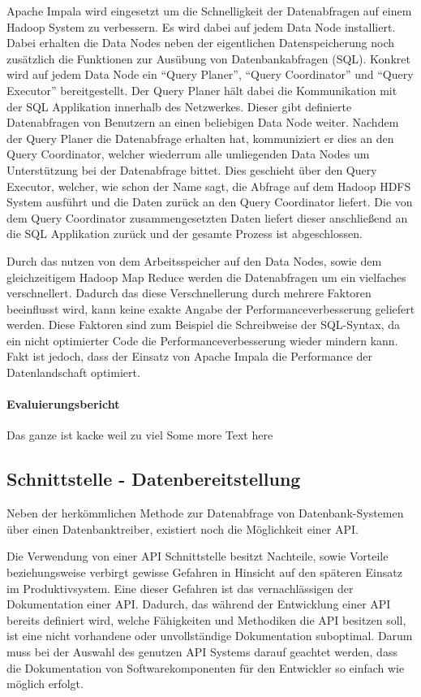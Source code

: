 Apache Impala wird eingesetzt um die Schnelligkeit der Datenabfragen auf
einem Hadoop System zu verbessern. Es wird dabei auf jedem Data Node
installiert. Dabei erhalten die Data Nodes neben der eigentlichen
Datenspeicherung noch zusätzlich die Funktionen zur Ausübung von
Datenbankabfragen (SQL). Konkret wird auf jedem Data Node ein ``Query Planer'',
``Query Coordinator'' und ``Query Executor'' bereitgestellt. Der Query Planer
hält dabei die Kommunikation mit der SQL Applikation innerhalb des Netzwerkes.
Dieser gibt definierte Datenabfragen von Benutzern an einen beliebigen Data
Node weiter. Nachdem der Query Planer die Datenabfrage erhalten hat,
kommuniziert er dies an den Query Coordinator, welcher wiederrum alle
umliegenden Data Nodes um Unterstützung bei der Datenabfrage bittet.
Dies geschieht über den Query Executor, welcher, wie schon der Name sagt,
die Abfrage auf dem Hadoop HDFS System ausführt und die Daten zurück an den
Query Coordinator liefert. Die von dem Query Coordinator zusammengesetzten
Daten liefert dieser anschließend an die SQL Applikation zurück und der
gesamte Prozess ist abgeschlossen.

Durch das nutzen von dem Arbeitsspeicher auf den Data Nodes, sowie dem
gleichzeitigem Hadoop Map Reduce werden die Datenabfragen um ein vielfaches
verschnellert. Dadurch das diese Verschnellerung durch mehrere Faktoren
beeinflusst wird, kann keine exakte Angabe der Performanceverbesserung
geliefert werden. Diese Faktoren sind zum Beispiel die Schreibweise der
SQL-Syntax, da ein nicht optimierter Code die Performanceverbesserung
wieder mindern kann. Fakt ist jedoch, dass der Einsatz von Apache Impala
die Performance der Datenlandschaft optimiert.
\nl%

\paragraph{Evaluierungsbericht}
\label{paragraph:hadoop_hive_impala_evaluierung}
Das ganze ist kacke weil zu viel Some more Text here
\nl%


\subsection{Schnittstelle - Datenbereitstellung}
\label{subsec:schnittstelle_datenbereitstellung}
Neben der herkömmlichen Methode zur Datenabfrage von Datenbank-Systemen über
einen Datenbanktreiber, existiert noch die Möglichkeit einer API\@.

Die Verwendung von einer API Schnittstelle besitzt Nachteile, sowie Vorteile
beziehungsweise verbirgt gewisse Gefahren in Hinsicht auf den späteren Einsatz
im Produktivsystem. Eine dieser Gefahren ist das vernachlässigen der
Dokumentation einer API\@. Dadurch, das während der Entwicklung einer API
bereits definiert wird, welche Fähigkeiten und Methodiken die API besitzen
soll, ist eine nicht vorhandene oder unvollständige Dokumentation suboptimal.
Darum muss bei der Auswahl des genutzen API Systems darauf geachtet werden,
dass die Dokumentation von Softwarekomponenten für den Entwickler so einfach
wie möglich erfolgt.

